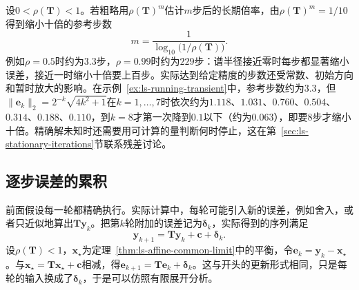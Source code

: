 设$0<\rho(\bm T)<1$。若粗略用$\rho(\bm T)^m$估计$m$步后的长期倍率，由$\rho(\bm T)^m=1/10$得到缩小十倍的参考步数
\[
 m=\frac{1}{\log_{10}\bigl(1/\rho(\bm T)\bigr)} .
\]
例如$\rho=0.5$时约为$3.3$步，$\rho=0.99$时约为$229$步：谱半径接近零时每步都显著缩小误差，接近一时缩小十倍要上百步。实际达到给定精度的步数还受常数、初始方向和暂时放大的影响。在示例~\ref{ex:ls-running-transient}中，参考步数约为$3.3$，但$\lVert\bm e_k\rVert_2=2^{-k}\sqrt{4k^2+1}$在$k=1,\ldots,7$时依次约为$1.118$、$1.031$、$0.760$、$0.504$、$0.314$、$0.188$、$0.110$，到$k=8$才第一次降到$0.1$以下（约为$0.063$），即要$8$步才缩小十倍。精确解未知时还需要用可计算的量判断何时停止，这在第~\ref{sec:ls-stationary-iterations}节联系残差讨论。

\subsection{逐步误差的累积}
\label{sec:ls-accumulated-step-errors}

前面假设每一轮都精确执行。实际计算中，每轮可能引入新的误差，例如舍入，或者只近似地算出$\bm T\bm y_k$。把第$k$轮附加的误差记为$\bm\delta_k$，实际得到的序列满足
\[
 \bm y_{k+1}=\bm T\bm y_k+\bm c+\bm\delta_k .
\]
设$\rho(\bm T)<1$，$\bm x_\star$为定理~\ref{thm:ls-affine-common-limit}中的平衡，令$\bm e_k=\bm y_k-\bm x_\star$。与$\bm x_\star=\bm T\bm x_\star+\bm c$相减，得$\bm e_{k+1}=\bm T\bm e_k+\bm\delta_k$。这与开头的更新形式相同，只是每轮的输入换成了$\bm\delta_k$，于是可以仿照有限展开分析。

